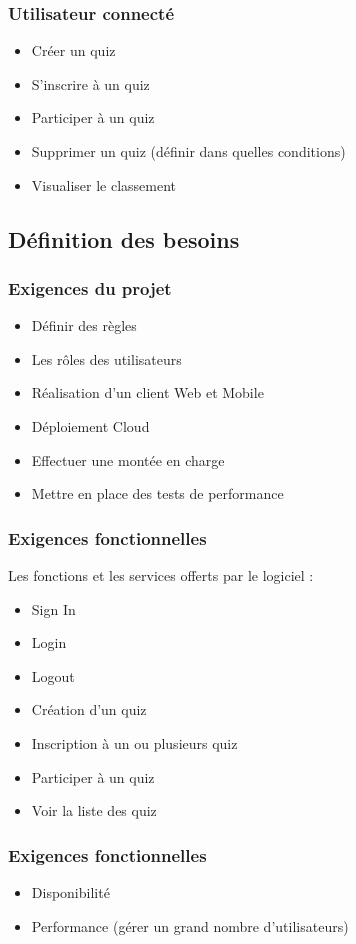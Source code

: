 \documentclass[a4paper, 12pt]{article}
\begin{document}
\subsubsection{Utilisateur connecté}
\begin{itemize}
    \item Créer un quiz
    \item S'inscrire à un quiz
    \item Participer à un quiz
    \item Supprimer un quiz (définir dans quelles conditions)
    \item Visualiser le classement
\end{itemize}
\subsection{Définition des besoins}
\subsubsection{Exigences du projet}
\begin{itemize}
    \item Définir des règles
    \item Les rôles des utilisateurs
    \item Réalisation d'un client Web et Mobile
    \item Déploiement Cloud
    \item Effectuer une montée en charge
    \item Mettre en place des tests de performance
\end{itemize}
\subsubsection{Exigences fonctionnelles}
Les fonctions et les services offerts par le logiciel :
\begin{itemize}
    \item Sign In
    \item Login
    \item Logout
    \item Création d'un quiz
    \item Inscription à un ou plusieurs quiz
    \item Participer à un quiz
    \item Voir la liste des quiz
\end{itemize}
\subsubsection{Exigences fonctionnelles}
\begin{itemize}
    \item Disponibilité
    \item Performance (gérer un grand nombre d'utilisateurs)
\end{itemize}
\end{document}
